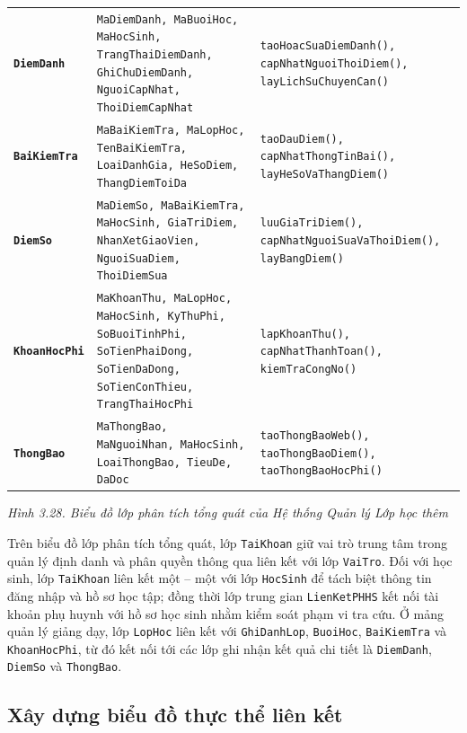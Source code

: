 \documentclass[12pt,a4paper]{article}
\begin{document}
\begin{center}
{{\begin{tabularx}{\linewidth}{@{}p{2.2cm} >{\raggedright\arraybackslash}X >{\raggedright\arraybackslash}X@{}}
\addlinespace[2pt]
\textbf{\texttt{DiemDanh}} & \texttt{MaDiemDanh, MaBuoiHoc, MaHocSinh, TrangThaiDiemDanh, GhiChuDiemDanh, NguoiCapNhat, ThoiDiemCapNhat} & \texttt{taoHoacSuaDiemDanh(), capNhatNguoiThoiDiem(), layLichSuChuyenCan()} \\
\addlinespace[2pt]
\textbf{\texttt{BaiKiemTra}} & \texttt{MaBaiKiemTra, MaLopHoc, TenBaiKiemTra, LoaiDanhGia, HeSoDiem, ThangDiemToiDa} & \texttt{taoDauDiem(), capNhatThongTinBai(), layHeSoVaThangDiem()} \\
\addlinespace[2pt]
\textbf{\texttt{DiemSo}} & \texttt{MaDiemSo, MaBaiKiemTra, MaHocSinh, GiaTriDiem, NhanXetGiaoVien, NguoiSuaDiem, ThoiDiemSua} & \texttt{luuGiaTriDiem(), capNhatNguoiSuaVaThoiDiem(), layBangDiem()} \\
\addlinespace[2pt]
\textbf{\texttt{KhoanHocPhi}} & \texttt{MaKhoanThu, MaLopHoc, MaHocSinh, KyThuPhi, SoBuoiTinhPhi, SoTienPhaiDong, SoTienDaDong, SoTienConThieu, TrangThaiHocPhi} & \texttt{lapKhoanThu(), capNhatThanhToan(), kiemTraCongNo()} \\
\addlinespace[2pt]
\textbf{\texttt{ThongBao}} & \texttt{MaThongBao, MaNguoiNhan, MaHocSinh, LoaiThongBao, TieuDe, DaDoc} & \texttt{taoThongBaoWeb(), taoThongBaoDiem(), taoThongBaoHocPhi()} \\
\bottomrule
\end{tabularx}
\vspace{4pt}
\normalsize\textit{Hình 3.28. Biểu đồ lớp phân tích tổng quát của Hệ thống Quản lý Lớp học thêm}
\vspace{2pt}
}}
\end{center}

Trên biểu đồ lớp phân tích tổng quát, lớp \texttt{TaiKhoan} giữ vai trò trung tâm trong quản lý định danh và phân quyền thông qua liên kết với lớp \texttt{VaiTro}. Đối với học sinh, lớp \texttt{TaiKhoan} liên kết một -- một với lớp \texttt{HocSinh} để tách biệt thông tin đăng nhập và hồ sơ học tập; đồng thời lớp trung gian \texttt{LienKetPHHS} kết nối tài khoản phụ huynh với hồ sơ học sinh nhằm kiểm soát phạm vi tra cứu. Ở mảng quản lý giảng dạy, lớp \texttt{LopHoc} liên kết với \texttt{GhiDanhLop}, \texttt{BuoiHoc}, \texttt{BaiKiemTra} và \texttt{KhoanHocPhi}, từ đó kết nối tới các lớp ghi nhận kết quả chi tiết là \texttt{DiemDanh}, \texttt{DiemSo} và \texttt{ThongBao}.

\subsection{Xây dựng biểu đồ thực thể liên kết}
\end{document}
